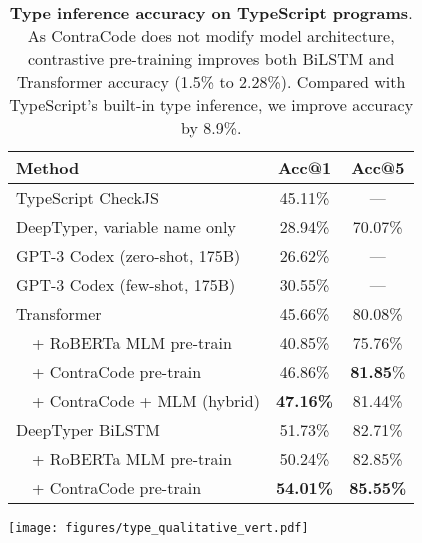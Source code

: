 \documentclass[11pt]{article}
\newcommand{\ours}[0]{ContraCode}
\begin{document}
\begin{table}[t]
\setlength\tabcolsep{1.2pt}
\centering
\begin{tabular}{lcc} \hline
    \textbf{Method}  & \textbf{Acc@1} & \textbf{Acc@5} \\ 
    \hline
    TypeScript CheckJS & 45.11\% & --- \\
    DeepTyper, variable name only & 28.94\% & 70.07\% \\ \hline
    GPT-3 Codex (zero-shot, 175B) & 26.62\% & --- \\
    GPT-3 Codex (few-shot, 175B) & 30.55\% & --- \\ \hline
    Transformer & 45.66\% & 80.08\% \\
    ~~+ RoBERTa MLM pre-train & 40.85\% & 75.76\%\\
    \cellcolor{Gray}~~+ \ours{} pre-train & \cellcolor{Gray}46.86\% & \cellcolor{Gray}\textbf{81.85}\%\\
    \cellcolor{Gray}~~+ \ours{} + MLM (hybrid) & \cellcolor{Gray}\textbf{47.16\%} & \cellcolor{Gray}81.44\%\\\hline
    DeepTyper BiLSTM & 51.73\% & 82.71\% \\
    ~~+ RoBERTa MLM pre-train & 50.24\% & 82.85\% \\
    \cellcolor{Gray}~~+ \ours{} pre-train & \cellcolor{Gray}\textbf{54.01\%} & \cellcolor{Gray}\textbf{85.55\%} \\
    \hline
\end{tabular}
\caption{\textbf{Type inference accuracy on TypeScript programs}. As \ours{} does not modify model architecture, contrastive pre-training improves both BiLSTM and Transformer accuracy (1.5\% to 2.28\%). Compared with TypeScript's built-in type inference, we improve accuracy by 8.9\%.}
\label{tab:types}
\end{table}


 
\begin{figure*}[t]
    \centering
    \texttt{[image: figures/type\_qualitative\_vert.pdf]}
    \caption{A variant of DeepTyper pre-trained with \ours{} generates type annotations for two held-out programs. The model consistently predicts correct function return types, and often correctly predicts project-specific variable types imported at the top of the file. Metrics are in the top row of Table~\ref{tab:mean_hidden_ablation} (not our best performing model).}
    \label{fig:qual_types}
\end{figure*}
 
\end{document}
